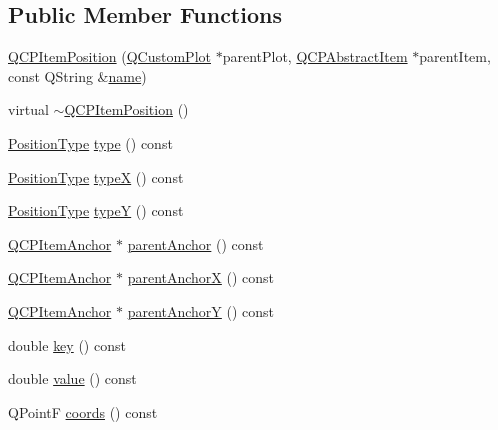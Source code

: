 \subsection*{Public Member Functions}
\begin{DoxyCompactItemize}
\item 
\mbox{\hyperlink{class_q_c_p_item_position_a6519a552bd9766354644ec24d1f26622}{Q\+C\+P\+Item\+Position}} (\mbox{\hyperlink{class_q_custom_plot}{Q\+Custom\+Plot}} $\ast$parent\+Plot, \mbox{\hyperlink{class_q_c_p_abstract_item}{Q\+C\+P\+Abstract\+Item}} $\ast$parent\+Item, const Q\+String \&\mbox{\hyperlink{class_q_c_p_item_anchor_aad37cdf5a3f63428f61be739014e212e}{name}})
\item 
virtual \mbox{\hyperlink{class_q_c_p_item_position_ad8a289016f7a62332f9c865c39ab2047}{$\sim$\+Q\+C\+P\+Item\+Position}} ()
\item 
\mbox{\hyperlink{class_q_c_p_item_position_aad9936c22bf43e3d358552f6e86dbdc8}{Position\+Type}} \mbox{\hyperlink{class_q_c_p_item_position_abfd74d86bd799306ce0295ffe433bdfc}{type}} () const
\item 
\mbox{\hyperlink{class_q_c_p_item_position_aad9936c22bf43e3d358552f6e86dbdc8}{Position\+Type}} \mbox{\hyperlink{class_q_c_p_item_position_a1415911868835701c04250566bfc681d}{typeX}} () const
\item 
\mbox{\hyperlink{class_q_c_p_item_position_aad9936c22bf43e3d358552f6e86dbdc8}{Position\+Type}} \mbox{\hyperlink{class_q_c_p_item_position_ae47bac6f679c58f9e1c78dc63d56f331}{typeY}} () const
\item 
\mbox{\hyperlink{class_q_c_p_item_anchor}{Q\+C\+P\+Item\+Anchor}} $\ast$ \mbox{\hyperlink{class_q_c_p_item_position_a0a87f9dce1af6cc9b510785991bcf1c6}{parent\+Anchor}} () const
\item 
\mbox{\hyperlink{class_q_c_p_item_anchor}{Q\+C\+P\+Item\+Anchor}} $\ast$ \mbox{\hyperlink{class_q_c_p_item_position_a605cb8b2cf6044d3d03cb1a894faf98a}{parent\+AnchorX}} () const
\item 
\mbox{\hyperlink{class_q_c_p_item_anchor}{Q\+C\+P\+Item\+Anchor}} $\ast$ \mbox{\hyperlink{class_q_c_p_item_position_aa40afec791a4339b09572922ca425ec2}{parent\+AnchorY}} () const
\item 
double \mbox{\hyperlink{class_q_c_p_item_position_a6fc519f1b73722a8d0cff7d4d647407e}{key}} () const
\item 
double \mbox{\hyperlink{class_q_c_p_item_position_acfcf86f840a7366a4299bff593d5d636}{value}} () const
\item 
Q\+PointF \mbox{\hyperlink{class_q_c_p_item_position_aa4ecf5b04c67049c05d37619e090820b}{coords}} () const

\end{DoxyCompactItemize}
